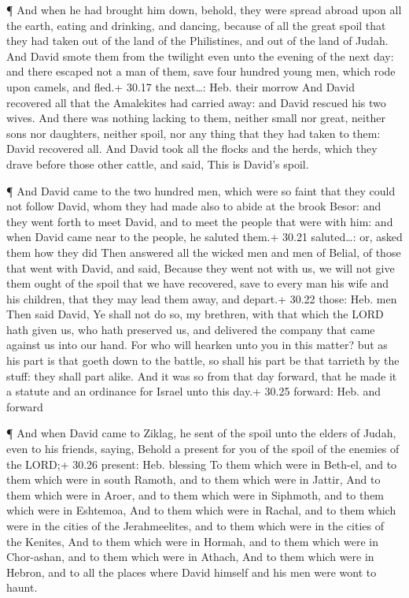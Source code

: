  ¶ And when he had brought him down, behold, they were
spread abroad upon all the earth, eating and drinking, and dancing,
because of all the great spoil that they had taken out of the land of
the Philistines, and out of the land of Judah.  And David
smote them from the twilight even unto the evening of the next day: and
there escaped not a man of them, save four hundred young men, which rode
upon camels, and fled.+ 30.17 the next\ldots: Heb. their morrow
 And David recovered all that the Amalekites had carried
away: and David rescued his two wives.  And there was
nothing lacking to them, neither small nor great, neither sons nor
daughters, neither spoil, nor any thing that they had taken to them:
David recovered all.  And David took all the flocks and the
herds, which they drave before those other cattle, and said, This is
David's spoil.

 ¶ And David came to the two hundred men, which were so
faint that they could not follow David, whom they had made also to abide
at the brook Besor: and they went forth to meet David, and to meet the
people that were with him: and when David came near to the people, he
saluted them.+ 30.21 saluted\ldots: or, asked them how they did
 Then answered all the wicked men and men of Belial, of
those that went with David, and said, Because they went not with us, we
will not give them ought of the spoil that we have recovered, save to
every man his wife and his children, that they may lead them away, and
depart.+ 30.22 those: Heb. men  Then said David, Ye shall
not do so, my brethren, with that which the LORD hath given us, who hath
preserved us, and delivered the company that came against us into our
hand.  For who will hearken unto you in this matter? but as
his part is that goeth down to the battle, so shall his part be that
tarrieth by the stuff: they shall part alike.  And it was
so from that day forward, that he made it a statute and an ordinance for
Israel unto this day.+ 30.25 forward: Heb. and forward

 ¶ And when David came to Ziklag, he sent of the spoil unto
the elders of Judah, even to his friends, saying, Behold a present for
you of the spoil of the enemies of the LORD;+ 30.26 present: Heb.
blessing  To them which were in Beth-el, and to them which
were in south Ramoth, and to them which were in Jattir, 
And to them which were in Aroer, and to them which were in Siphmoth, and
to them which were in Eshtemoa,  And to them which were in
Rachal, and to them which were in the cities of the Jerahmeelites, and
to them which were in the cities of the Kenites,  And to
them which were in Hormah, and to them which were in Chor-ashan, and to
them which were in Athach,  And to them which were in
Hebron, and to all the places where David himself and his men were wont
to haunt.

